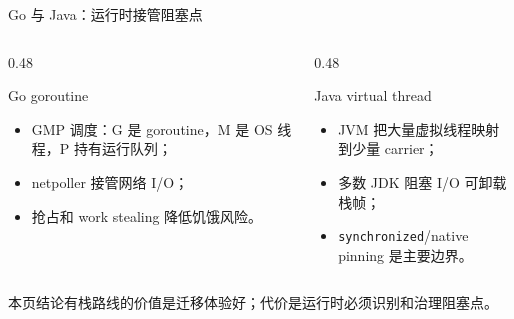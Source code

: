 \documentclass[UTF8,aspectratio=169,11pt]{ctexbeamer}
\newcommand{\takeaway}[1]{\begin{block}{本页结论}#1\end{block}}
\begin{document}
\begin{frame}{Go 与 Java：运行时接管阻塞点}
  \begin{columns}[T,totalwidth=\linewidth]
    \begin{column}{0.48\linewidth}
      \begin{block}{Go goroutine}
        \begin{itemize}
          \item GMP 调度：G 是 goroutine，M 是 OS 线程，P 持有运行队列；
          \item netpoller 接管网络 I/O；
          \item 抢占和 work stealing 降低饥饿风险。
        \end{itemize}
      \end{block}
    \end{column}
    \begin{column}{0.48\linewidth}
      \begin{exampleblock}{Java virtual thread}
        \begin{itemize}
          \item JVM 把大量虚拟线程映射到少量 carrier；
          \item 多数 JDK 阻塞 I/O 可卸载栈帧；
          \item \texttt{synchronized}/native pinning 是主要边界。
        \end{itemize}
      \end{exampleblock}
    \end{column}
  \end{columns}
  \takeaway{有栈路线的价值是迁移体验好；代价是运行时必须识别和治理阻塞点。}
\end{frame}
\end{document}
